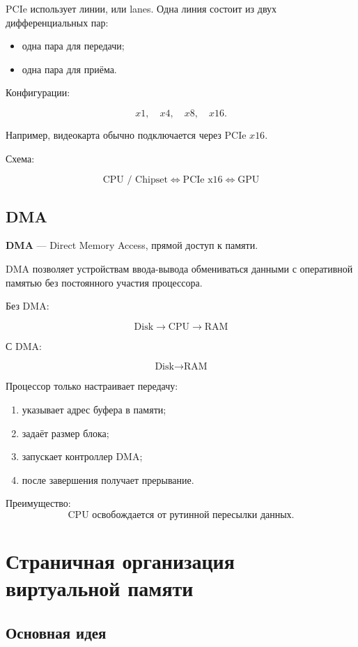 \documentclass[12pt,a4paper]{article}
\theoremstyle{remark}
\begin{document}
PCIe использует линии, или lanes. Одна линия состоит из двух дифференциальных пар:
\begin{itemize}
    \item одна пара для передачи;
    \item одна пара для приёма.
\end{itemize}

Конфигурации:

\[
x1,\quad x4,\quad x8,\quad x16.
\]

Например, видеокарта обычно подключается через PCIe $x16$.

Схема:

\[
\boxed{\text{CPU / Chipset}}
\Longleftrightarrow
\boxed{\text{PCIe x16}}
\Longleftrightarrow
\boxed{\text{GPU}}
\]

\subsection{DMA}

\textbf{DMA} --- Direct Memory Access, прямой доступ к памяти.

DMA позволяет устройствам ввода-вывода обмениваться данными с оперативной памятью без постоянного участия процессора.

Без DMA:

\[
\boxed{\text{Disk}} \rightarrow \boxed{\text{CPU}} \rightarrow \boxed{\text{RAM}}
\]

С DMA:

\[
\boxed{\text{Disk}} \rightarrow \boxed{\text{RAM}}
\]

Процессор только настраивает передачу:
\begin{enumerate}
    \item указывает адрес буфера в памяти;
    \item задаёт размер блока;
    \item запускает контроллер DMA;
    \item после завершения получает прерывание.
\end{enumerate}

Преимущество:
\[
\text{CPU освобождается от рутинной пересылки данных.}
\]

\section{Страничная организация виртуальной памяти}

\subsection{Основная идея}
\end{document}
